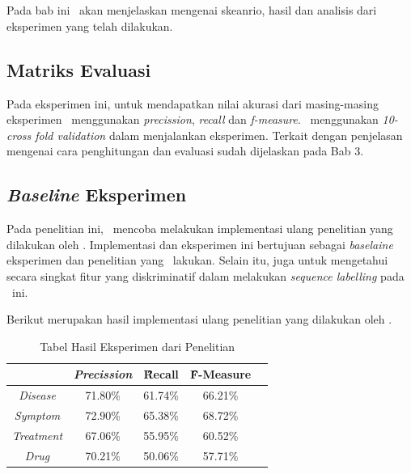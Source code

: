 \chapter{\babLima}

Pada bab ini \saya~akan menjelaskan mengenai skeanrio, hasil dan analisis dari eksperimen yang telah dilakukan.

\section{Matriks Evaluasi}
Pada eksperimen ini, untuk mendapatkan nilai akurasi dari masing-masing eksperimen \saya~menggunakan \textit{precission}, \textit{recall} dan \textit{f-measure}. \Saya~menggunakan \textit{10-cross fold validation} dalam menjalankan eksperimen. Terkait dengan penjelasan mengenai cara penghitungan dan evaluasi sudah dijelaskan pada Bab 3.

\section{\textit{Baseline} Eksperimen}
Pada penelitian ini, \saya~mencoba melakukan implementasi ulang penelitian yang dilakukan oleh \cite{skripsiKakRadit}. Implementasi dan eksperimen ini bertujuan sebagai \textit{baselaine} eksperimen dan penelitian yang \saya~lakukan. Selain itu, juga untuk mengetahui secara singkat fitur yang diskriminatif dalam melakukan \textit{sequence labelling} pada \mer~ini.

Berikut merupakan hasil implementasi ulang penelitian yang dilakukan oleh \cite{skripsiKakRadit}.
	
\begin{table}
	\centering
	\caption{Tabel Hasil Eksperimen dari Penelitian \cite{skripsiKakRadit}}
	\begin{tabular}{|c|c|c|c|c|}
		\hline
							& \textit{Precission} & \f{\f{Recall}} & \f{\f{F-Measure}} \\ \hline
		\textit{Disease}    & 71.80\%             & 61.74\%        & 66.21\%           \\ \hline
		\textit{Symptom}    & 72.90\%             & 65.38\%        & 68.72\%           \\ \hline
		\textit{Treatment}  & 67.06\%             & 55.95\%        & 60.52\%           \\ \hline
		\textit{Drug}		& 70.21\%             & 50.06\%        & 57.71\%           \\ \hline
	    \end{tabular}
\label{table:radit}
\end{table}

